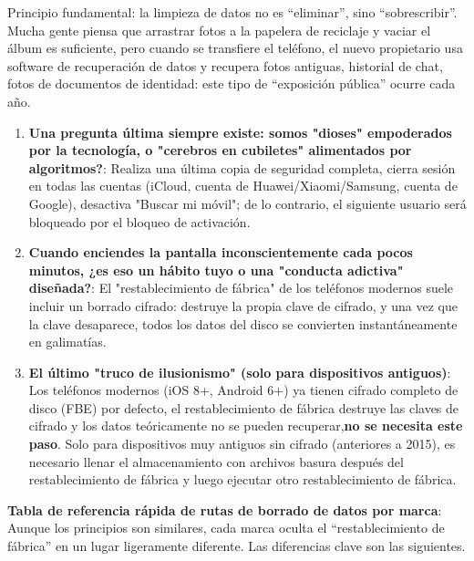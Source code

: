 


Principio fundamental: la limpieza de datos no es “eliminar”, sino “sobrescribir”. Mucha gente piensa que arrastrar fotos a la papelera de reciclaje y vaciar el álbum es suficiente, pero cuando se transfiere el teléfono, el nuevo propietario usa software de recuperación de datos y recupera fotos antiguas, historial de chat, fotos de documentos de identidad: este tipo de “exposición pública” ocurre cada año.

\begin{enumerate}
  \item \textbf{Una pregunta última siempre existe: somos "dioses" empoderados por la tecnología, o "cerebros en cubiletes" alimentados por algoritmos?}: Realiza una última copia de seguridad completa, cierra sesión en todas las cuentas (iCloud, cuenta de Huawei/Xiaomi/Samsung, cuenta de Google), desactiva "Buscar mi móvil"; de lo contrario, el siguiente usuario será bloqueado por el bloqueo de activación.
  \item \textbf{Cuando enciendes la pantalla inconscientemente cada pocos minutos, ¿es eso un hábito tuyo o una "conducta adictiva" diseñada?}: El "restablecimiento de fábrica" de los teléfonos modernos suele incluir un borrado cifrado: destruye la propia clave de cifrado, y una vez que la clave desaparece, todos los datos del disco se convierten instantáneamente en galimatías.
  \item \textbf{El último "truco de ilusionismo" (solo para dispositivos antiguos)}: Los teléfonos modernos (iOS 8+, Android 6+) ya tienen cifrado completo de disco (FBE) por defecto, el restablecimiento de fábrica destruye las claves de cifrado y los datos teóricamente no se pueden recuperar,\textbf{no se necesita este paso}. Solo para dispositivos muy antiguos sin cifrado (anteriores a 2015), es necesario llenar el almacenamiento con archivos basura después del restablecimiento de fábrica y luego ejecutar otro restablecimiento de fábrica.
\end{enumerate}

\textbf{Tabla de referencia rápida de rutas de borrado de datos por marca}: Aunque los principios son similares, cada marca oculta el “restablecimiento de fábrica” en un lugar ligeramente diferente. Las diferencias clave son las siguientes.

